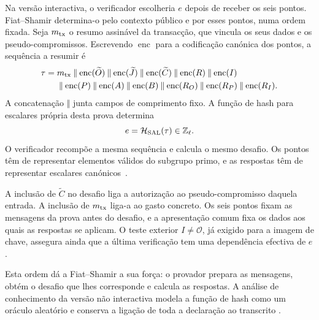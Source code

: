 Na versão interactiva, o verificador escolheria \(e\) depois
de receber os seis pontos. Fiat--Shamir determina-o pelo contexto
público e por esses pontos, numa ordem fixada. Seja \(m_{\rm tx}\)
o resumo assinável da transacção, que vincula os seus dados e os
pseudo-compromissos. Escrevendo \(\operatorname{enc}\) para a
codificação canónica dos pontos, a sequência a resumir é
\[
 \begin{aligned}
 \tau={}&m_{\rm tx}
   \mathbin\Vert\operatorname{enc}(\widetilde O)
   \mathbin\Vert\operatorname{enc}(\widetilde J)
   \mathbin\Vert\operatorname{enc}(\widetilde C)
   \mathbin\Vert\operatorname{enc}(R)
   \mathbin\Vert\operatorname{enc}(I)\\
  &\mathbin\Vert\operatorname{enc}(P)
   \mathbin\Vert\operatorname{enc}(A)
   \mathbin\Vert\operatorname{enc}(B)
   \mathbin\Vert\operatorname{enc}(R_O)
   \mathbin\Vert\operatorname{enc}(R_P)
   \mathbin\Vert\operatorname{enc}(R_I).
 \end{aligned}
\]
A concatenação \(\Vert\) junta campos de comprimento fixo.
A função de hash para escalares própria desta prova determina
\begin{equation}
 e=\mathcal H_{\rm SAL}(\tau)\in\mathbb Z_\ell.
 \label{eq:fcmp-sal-challenge}
\end{equation}
O verificador recompõe a mesma sequência e calcula o mesmo
desafio. Os pontos têm de representar elementos válidos do
subgrupo primo, e as respostas têm de representar escalares
canónicos~\cite{monero-oxide-fcmp-source}.

A inclusão de \(\widetilde C\) no desafio liga a autorização
ao pseudo-compromisso daquela entrada. A inclusão de
\(m_{\rm tx}\) liga-a ao gasto concreto. Os seis pontos
fixam as mensagens da prova antes do desafio, e a apresentação
comum fixa os dados aos quais as respostas se aplicam. O teste
exterior \(I\ne\mathcal O\), já exigido para a imagem de
chave, assegura ainda que a última verificação tem uma
dependência efectiva de \(e\).

Esta ordem dá a Fiat--Shamir a sua força: o provador prepara
as mensagens, obtém o desafio que lhes corresponde e calcula
as respostas. A análise de conhecimento da versão não
interactiva modela a função de hash como um oráculo aleatório
e conserva a ligação de toda a declaração ao transcrito
\cite{fcmp-composition-review}.


